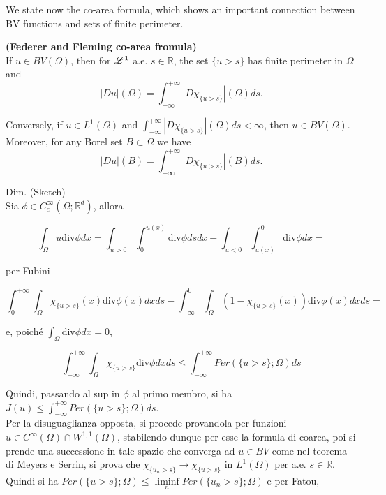 We state now the co-area formula, which shows an important connection between BV functions and sets of finite perimeter.




















\begin{theorem} \label{Federer-Fleming co-area} {\bf (Federer and Fleming co-area fromula)}
\\
If $u \in BV(\Omega)$, then for $\mathscr{L}^{1}$ a.e. $s \in \mathbb{R}$, the set $\{ u > s \}$ has finite perimeter in $\Omega$ and
\[ |Du|(\Omega) = \int_{-\infty}^{+\infty} |D\chi_{\{u > s\}}|(\Omega) ds. \]

Conversely, if $u \in L^{1}(\Omega)$ and $\int_{-\infty}^{+\infty} |D\chi_{\{u > s\}}|(\Omega) ds < \infty$, then $u \in BV(\Omega)$.
\\
Moreover, for any Borel set $B \subset \Omega$ we have
\[ |Du|(B) = \int_{-\infty}^{+\infty} |D\chi_{\{u > s\}}|(B) ds. \]
\end{theorem}
Dim. (Sketch)
\\

Sia $\phi \in C_{c}^{\infty}(\Omega; \mathbb{R}^{d})$, allora

\[ \int_{\Omega} u\mathrm{div}\phi dx = \int_{u > 0} \int_{0}^{u(x)} \mathrm{div}\phi ds dx - \int_{u < 0} \int_{u(x)}^{0} \mathrm{div}\phi dx = \]
 
 per Fubini

\[ \int_{0}^{+\infty} \int_{\Omega} \chi_{\{u > s\}}(x) \mathrm{div}\phi(x) dx ds - \int_{-\infty}^{0} \int_{\Omega} (1 - \chi_{\{u > s\}}(x)) \mathrm{div}\phi(x) dx ds =\]

e, poiché $\int_{\Omega} \mathrm{div}\phi dx = 0$,

\[ \int_{-\infty}^{+\infty} \int_{\Omega} \chi_{\{u > s\}} \mathrm{div} \phi dx ds \le \int_{-\infty}^{+\infty} Per( \{u > s\}; \Omega) ds \]

Quindi, passando al sup in $\phi$ al primo membro, si ha $J(u) \le \int_{-\infty}^{+\infty} Per( \{u > s\}; \Omega) ds$.
\\
Per la disuguaglianza opposta, si procede provandola per funzioni $u \in C^{\infty}(\Omega) \cap W^{1,1}(\Omega)$, stabilendo dunque per esse la formula di coarea, poi si prende una successione in tale spazio che converga ad $u \in BV$ come nel teorema di Meyers e Serrin, si prova che $\chi_{\{u_{n} > s\}} \to \chi_{\{u > s\}}$ in $L^{1}(\Omega)$ per a.e. $s \in \mathbb{R}$. Quindi si ha $Per(\{u > s\}; \Omega) \le \liminf\limits_{n} Per(\{u_{n} > s\}; \Omega)$ e per Fatou,


